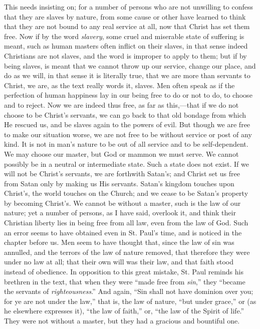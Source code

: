 This needs insisting on; for a number of persons who are not
unwilling to confess that they are slaves by nature, from some cause
or other have learned to think that they are not bound to any real
service at all, now that Christ has set them free. Now if by the word \emph{slavery},
some cruel and miserable state of suffering is meant, such as human
masters often inflict on their slaves, in that sense indeed Christians
are not slaves, and the word is improper to apply to them; but if by
being slaves, is meant that we cannot throw up our service, change our
place, and do as we will, in that sense it is literally true, that we
are more than servants to Christ, we are, as the text really words it,
slaves. Men often speak as if the perfection of human happiness lay in
our being free to do or not to do, to choose and to reject. Now we are
indeed thus free, as far as this,—that if we do not choose to be
Christ's servants, we can go back to that old bondage from which He
rescued us, and be slaves again to the powers of evil. But though we
are free to make our situation worse, we are not free to be without
service or post of any kind. It is not in man's nature to be out of
all service and to be self-dependent. We may choose our master, but
God or mammon we must serve. We cannot possibly be in a neutral or
intermediate state. Such a state does not exist. If we will not be
Christ's servants, we are forthwith Satan's; and Christ set us free
from Satan only by making us His servants. Satan's kingdom touches
upon Christ's, the world touches on the Church; and we cease to be
Satan's property by becoming Christ's. We cannot be without a master,
such is the law of our nature; yet a number of persons, as I have
said, overlook it, and think their Christian liberty lies in being
free from all law, even from the law of God. Such an error seems to
have obtained even in St. Paul's time, and is noticed in the chapter
before us. Men seem to have thought that, since the law of sin was
annulled, and the terrors of the law of nature removed, that therefore
they were under no law at all; that their own will was their law, and
that faith stood instead of obedience. In opposition to this great
mistake, St. Paul reminds his brethren in the text, that when they
were ``made free from \emph{sin},'' they ``became the
servants of \emph{righteousness}.'' And again, ``Sin shall not
have dominion over you; for ye are not under the law,'' that is,
the law of nature, ``but under grace,'' or (as he elsewhere
expresses it), ``the law of faith,'' or, ``the law of the
Spirit of life.'' They were not without a master, but they had a
gracious and bountiful one.


